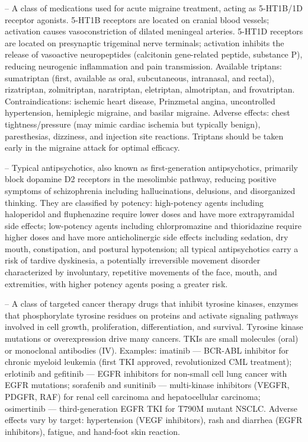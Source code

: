 -- A class of medications used for acute migraine treatment, acting as 5-HT1B/1D receptor agonists. 5-HT1B receptors are located on cranial blood vessels; activation causes vasoconstriction of dilated meningeal arteries. 5-HT1D receptors are located on presynaptic trigeminal nerve terminals; activation inhibits the release of vasoactive neuropeptides (calcitonin gene-related peptide, substance P), reducing neurogenic inflammation and pain transmission. Available triptans: sumatriptan (first, available as oral, subcutaneous, intranasal, and rectal), rizatriptan, zolmitriptan, naratriptan, eletriptan, almotriptan, and frovatriptan. Contraindications: ischemic heart disease, Prinzmetal angina, uncontrolled hypertension, hemiplegic migraine, and basilar migraine. Adverse effects: chest tightness/pressure (may mimic cardiac ischemia but typically benign), paresthesias, dizziness, and injection site reactions. Triptans should be taken early in the migraine attack for optimal efficacy.

-- Typical antipsychotics, also known as first-generation antipsychotics, primarily block dopamine D2 receptors in the mesolimbic pathway, reducing positive symptoms of schizophrenia including hallucinations, delusions, and disorganized thinking. They are classified by potency: high-potency agents including haloperidol and fluphenazine require lower doses and have more extrapyramidal side effects; low-potency agents including chlorpromazine and thioridazine require higher doses and have more anticholinergic side effects including sedation, dry mouth, constipation, and postural hypotension; all typical antipsychotics carry a risk of tardive dyskinesia, a potentially irreversible movement disorder characterized by involuntary, repetitive movements of the face, mouth, and extremities, with higher potency agents posing a greater risk.

-- A class of targeted cancer therapy drugs that inhibit tyrosine kinases, enzymes that phosphorylate tyrosine residues on proteins and activate signaling pathways involved in cell growth, proliferation, differentiation, and survival. Tyrosine kinase mutations or overexpression drive many cancers. TKIs are small molecules (oral) or monoclonal antibodies (IV). Examples: imatinib — BCR-ABL inhibitor for chronic myeloid leukemia (first TKI approved, revolutionized CML treatment); erlotinib and gefitinib — EGFR inhibitors for non-small cell lung cancer with EGFR mutations; sorafenib and sunitinib — multi-kinase inhibitors (VEGFR, PDGFR, RAF) for renal cell carcinoma and hepatocellular carcinoma; osimertinib — third-generation EGFR TKI for T790M mutant NSCLC. Adverse effects vary by target: hypertension (VEGF inhibitors), rash and diarrhea (EGFR inhibitors), fatigue, and hand-foot skin reaction.

